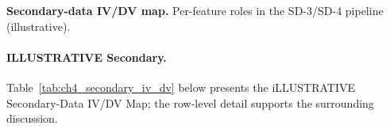 \noindent\textbf{Secondary-data IV/DV map.} Per-feature roles in the SD-3/SD-4 pipeline (illustrative).

\noindent{}\vspace{4pt}

\paragraph{ILLUSTRATIVE Secondary.}
\noindent Table~\ref{tab:ch4_secondary_iv_dv} below presents the iLLUSTRATIVE Secondary-Data IV/DV Map; the row-level detail supports the surrounding discussion.



